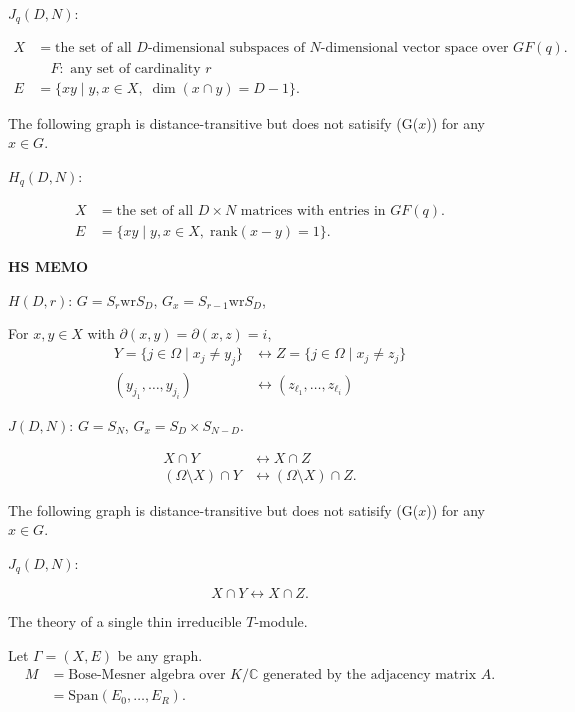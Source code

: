 \documentclass[
]{book}
\theoremstyle{definition}
\theoremstyle{definition}
\theoremstyle{definition}
\theoremstyle{definition}
\theoremstyle{remark}
\begin{document}
\(J_q(D, N)\):

\begin{align}
X & = \text{the set of all $D$-dimensional subspaces of $N$-dimensional vector space over $GF(q)$.}\\
& \quad F: \text{ any set of cardinality $r$}\\
E & = \{xy\mid y, x\in X, \; \dim (x\cap y) = D-1\}.
\end{align}

The following graph is distance-transitive but does not satisify (G(\(x\))) for any \(x\in G\).

\(H_q(D,N)\):

\begin{align}
X & = \text{the set of all $D\times N$ matrices with entries in $GF(q)$}.\\
E & = \{xy\mid y, x\in X, \; \mathrm{rank}(x-y) = 1\}.
\end{align}

\textbf{HS MEMO}

\(H(D,r)\): \(G = S_r \mathrm{wr} S_D\), \(G_x = S_{r-1} \mathrm{wr} S_D\),

For \(x, y\in X\) with \(\partial(x, y) = \partial(x,z) = i\),
\begin{align}
Y = \{j\in \Omega \mid x_j\neq y_j\} & \leftrightarrow Z = \{j\in \Omega \mid x_j\neq z_j\}\\
(y_{j_1}, \ldots, y_{j_i}) & \leftrightarrow (z_{\ell_1}, \ldots, z_{\ell_i})
\end{align}

\(J(D, N)\): \(G = S_N\), \(G_x = S_D \times S_{N-D}\).

\begin{align}
X\cap Y & \leftrightarrow X \cap Z\\
(\Omega \setminus X)\cap Y & \leftrightarrow (\Omega \setminus X)\cap Z.
\end{align}

The following graph is distance-transitive but does not satisify (G(\(x\))) for any \(x\in G\).

\(J_q(D,N)\):

\[X\cap Y  \leftrightarrow X \cap Z.\]

The theory of a single thin irreducible \(T\)-module.

Let \(\Gamma = (X, E)\) be any graph.
\begin{align}
M & = \text{Bose-Mesner algebra over $K/\mathbb{C}$ generated by the adjacency matrix $A$.}\\
& = \mathrm{Span}(E_0, \ldots, E_R).
\end{align}
\end{document}
